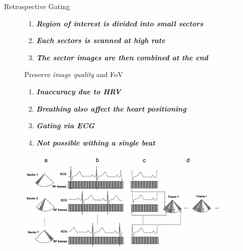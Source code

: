 \documentclass[t,12pt,english
\ifx\beamermode\undefined\else,\beamermode\fi
]{beamer}
\begin{document}
\begin{frame}{Retrospective Gating}


\begin{figure}[!htb]
\begin{block}{\footnotesize{}}\tiny{}
\begin{enumerate} 
\vspace{0.05cm}

     \item \tiny{\textbf{\textit{Region of interest is divided into small sectors}}}
     \item \tiny{\textbf{\textit{Each sectors is scanned at high rate}}}
     \item \tiny{\textbf{\textit{The sector images are then combined at the end}}}

\end{enumerate}
\end{block}

\begin{block}{\footnotesize{\tiny Preserve \textit{image quality} and FoV\cite{3}}}\tiny{}
\begin{enumerate} 
\vspace{0.05cm}
\color{red}
     \item \tiny{\textbf{\textit{Inaccuracy due to HRV}}}
     \item \tiny{\textbf{\textit{Breathing also affect the heart positioning}}}
     \item \tiny{\textbf{\textit{Gating via ECG}}}
     \item \tiny{\textbf{\textit{Not possible withing a single beat}}}

\end{enumerate}
\end{block}

\endminipage
{}
\centering
\includegraphics[width=1.2\textwidth]{13.jpg}
\endminipage
\end{figure}


\end{frame}
\end{document}
